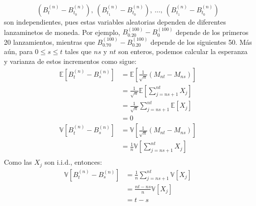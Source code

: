 \documentclass[11pt,notitlepage]{article}
\begin{document}
\[\left ( B^{(n)}_{t} - B^{(n)}_{t_0} \right ), \ \left ( B^{(n)}_{t_1} - B^{(n)}_{t_0} \right ), \ \dots, \ \left ( B^{(n)}_{t_1} - B^{(n)}_{t_0} \right )\]
son independientes, pues estas variables aleatorias dependen de diferentes lanzaminetos de moneda. Por ejemplo, $B^{(100)}_{0.20} - B^{(100)}_{0}$ depende de los primeros 20 lanzamientos, mientras que $B^{(100)}_{0.70} - B^{(100)}_{0.20}$ depende de los siguientes 50. Más aún, para $0\leq s\leq t$ tales que $ns$ y $nt$ son enteros, podemos calcular la esperanza y varianza de estos incrementos como sigue:
\begin{align*}
   \mathbb{E}[B^{(n)}_{t} - B^{(n)}_{s}] &= \mathbb{E}\left[\frac{1}{\sqrt{n}}\left(M_{nt}- M_{ns}\right)\right] \\
   &= \frac{1}{\sqrt{n}} \mathbb{E} \left[\sum_{j=ns+1}^{nt}X_j\right]\\
   &=\frac{1}{\sqrt{n}} \sum_{j=ns+1}^{nt} \mathbb{E} \left[X_j\right]\\
   &= 0
\end{align*}
\begin{align*}
   \mathbb{V}[B^{(n)}_{t} - B^{(n)}_{s}] &= \mathbb{V}\left[\frac{1}{\sqrt{n}}\left(M_{nt}- M_{ns}\right)\right] \\
   &= \frac{1}{n} \mathbb{V} \left[\sum_{j=ns+1}^{nt}X_j\right]\\
   \end{align*}
Como las $X_j$ son i.i.d., entonces: 
   \begin{align*}
         \mathbb{V}[B^{(n)}_{t} - B^{(n)}_{s}]&=\frac{1}{n} \sum_{j=ns+1}^{nt} \mathbb{V} \left[X_j\right]\\
   &= \frac{nt - ns}{n}\mathbb{V}[X_j]\\
   &= t-s
   \end{align*}
\end{document}
